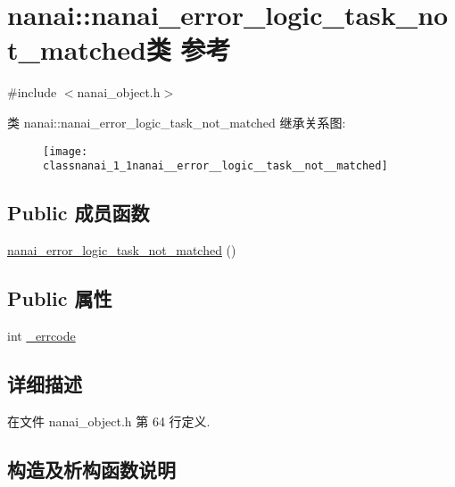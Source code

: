 \hypertarget{classnanai_1_1nanai__error__logic__task__not__matched}{}\section{nanai\+:\+:nanai\+\_\+error\+\_\+logic\+\_\+task\+\_\+not\+\_\+matched类 参考}
\label{classnanai_1_1nanai__error__logic__task__not__matched}


{\ttfamily \#include $<$nanai\+\_\+object.\+h$>$}

类 nanai\+:\+:nanai\+\_\+error\+\_\+logic\+\_\+task\+\_\+not\+\_\+matched 继承关系图\+:\begin{figure}[H]
\begin{center}
\leavevmode
\texttt{[image: classnanai\_1\_1nanai\_\_error\_\_logic\_\_task\_\_not\_\_matched]}
\end{center}
\end{figure}
\subsection*{Public 成员函数}
\begin{DoxyCompactItemize}
\item 
\hyperlink{classnanai_1_1nanai__error__logic__task__not__matched_a94f76745dd25d220afd5dea030f07496}{nanai\+\_\+error\+\_\+logic\+\_\+task\+\_\+not\+\_\+matched} ()
\end{DoxyCompactItemize}
\subsection*{Public 属性}
\begin{DoxyCompactItemize}
\item 
int \hyperlink{classnanai_1_1nanai__error__logic__task__not__matched_a3e73ce12d629068c63360384585d62c9}{\+\_\+errcode}
\end{DoxyCompactItemize}


\subsection{详细描述}


在文件 nanai\+\_\+object.\+h 第 64 行定义.



\subsection{构造及析构函数说明}
\hypertarget{classnanai_1_1nanai__error__logic__task__not__matched_a94f76745dd25d220afd5dea030f07496}{}
